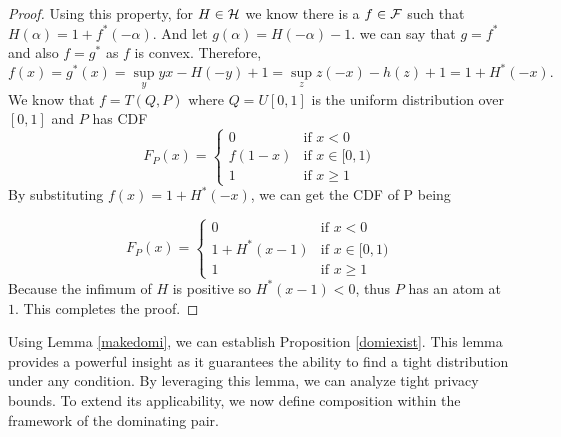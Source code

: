 \documentclass{article}
\begin{document}
\begin{lemma}
\begin{proof}
Using this property, for $H \in {\mathcal{H}}$ we know there is a $f \in {\mathcal{F}}$ such that $H(\alpha) = 1+f^*(-\alpha)$. And let $g(\alpha) = H(-\alpha) -1 $. we can say that $g = f^*$ and also $f=g^*$ as $f$ is convex. Therefore, 
\begin{equation*}
    f(x) = g^*(x) = \sup_y yx - H(-y)+1 = \sup_z z(-x)-h(z) + 1 = 1 +H^*(-x).
\end{equation*}
We know that $f = T(Q,P)$ where $Q = U[0,1]$ is the uniform distribution over $[0,1]$ and $P$ has CDF
\begin{equation*}
    F_P(x) = \begin{cases}
        0 &\text{if } x<0\\
        f(1-x) &\text{if } x\in [0,1)\\
        1 &\text{if } x \ge 1 
    \end{cases}
\end{equation*}
By substituting $f(x) = 1+H^*(-x)$, we can get the CDF of P being

\begin{equation*}
    F_P(x) = \begin{cases}
        0 &\text{if } x<0\\
        1+H^*(x-1) &\text{if } x\in [0,1)\\
        1 &\text{if } x \ge 1 
    \end{cases}
\end{equation*}
Because the infimum of $H$ is positive so $H^*(x-1)<0$, thus $P$ has an atom at $1$. This completes the proof.

\end{proof}
\end{lemma}

Using Lemma \ref{makedomi}, we can establish Proposition \ref{domiexist}. This lemma provides a powerful insight as it guarantees the ability to find a tight distribution under any condition. By leveraging this lemma, we can analyze tight privacy bounds. To extend its applicability, we now define composition within the framework of the dominating pair.
\end{document}
